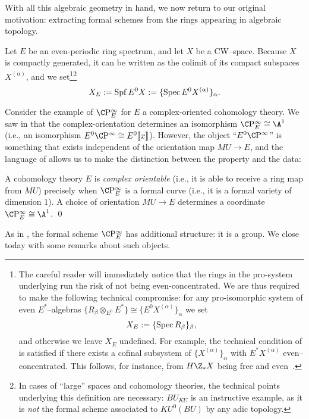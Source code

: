 With all this algebraic geometry in hand, we now return to our original motivation: extracting formal schemes from the rings appearing in algebraic topology.

\begin{definition}\label{FullDefnOfXE}
Let $E$ be an even-periodic ring spectrum, and let $X$ be a CW--space.  Because $X$ is compactly generated, it can be written as the colimit of its compact subspaces $X^{(\alpha)}$, and we set\footnote{The careful reader will immediately notice that the rings in the pro-system underlying  run the risk of not being even-concentrated.  We are thus required to make the following technical compromise: for any pro-isomorphic system of even $E^*$--algebras $\{R_\beta \otimes_{E^0} E^*\} \cong \{E^0 X^{(\alpha)}\}_\alpha$ we set \[X_E := \{\operatorname{Spec} R_\beta\}_\beta,\] and otherwise we leave $X_E$ undefined.  For example, the technical condition of  is satisfied if there exists a cofinal subsystem of $\{X^{(\alpha)}\}_\alpha$ with $E^* X^{(\alpha)}$ even--concentrated.  This follows, for instance, from $H\Z_* X$ being free and even~\cite[Definition 8.15, Proposition 8.17]{StricklandFSFG}.}\footnote{In cases of ``large'' spaces and cohomology theories, the technical points underlying this definition are necessary: $BU_{KU}$ is an instructive example, as it is \emph{not} the formal scheme associated to $KU^0(BU)$ by any adic topology.} \[X_E := \operatorname{Spf} E^0 X := \{\operatorname{Spec} E^0 X^{(\alpha)}\}_\alpha.\]
\end{definition}

Consider the example of $\CP^\infty_E$ for $E$ a complex-oriented cohomology theory.  We saw in  that the complex-orientation determines an isomorphism $\CP^\infty_E \cong \A^1$ (i.e., an isomorphism $E^0 \CP^\infty \cong E^0\ps{x}$).  However, the object ``$E^0 \CP^\infty$'' is something that exists independent of the orientation map $MU \to E$, and the language of  allows us to make the distinction between the property and the data:
\begin{lemma}
A cohomology theory $E$ is \textit{complex orientable} (i.e., it is able to receive a ring map from $MU$) precisely when $\CP^\infty_E$ is a formal curve (i.e., it is a formal variety of dimension $1$).  A choice of orientation $MU \to E$ determines a coordinate $\CP^\infty_E \cong \A^1$. \qed
\end{lemma}

As in , the formal scheme $\CP^\infty_E$ has additional structure: it is a group.  We close today with some remarks about such objects.

